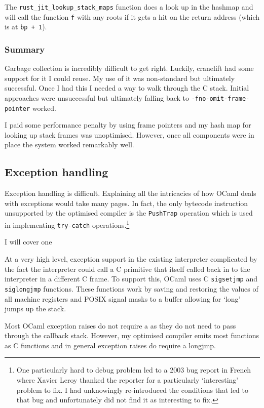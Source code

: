 The \texttt{rust\_jit\_lookup\_stack\_maps} function does a look up in the hashmap and will call
the function \texttt{f} with any roots if it gets a hit on the return address (which is at
\texttt{bp + 1}).

\subsubsection{Summary}

Garbage collection is incredibly difficult to get right. Luckily, cranelift had some support for it
I could reuse. My use of it was non-standard but ultimately successful. Once I had this I needed a
way to walk through the C stack. Initial approaches were unsuccessful but ultimately falling back
to
\texttt{-fno-omit-frame-pointer} worked.

I paid some performance penalty by using frame pointers and my hash map for looking up stack frames
was unoptimised. However, once all components were in place the system worked remarkably well.

\subsection{Exception handling}

Exception handling is difficult. Explaining all the intricacies of how OCaml deals with
exceptions would take many pages. In fact, the only bytecode instruction unsupported by the
optimised compiler is the \texttt{PushTrap} operation which is used in implementing
\texttt{try-catch} operations.\footnote{One particularly hard to debug problem led to a 2003 bug
      report in French where Xavier Leroy thanked the reporter for a particularly `interesting'
      problem
      to fix. I had unknowingly re-introduced the conditions that led to that bug and unfortunately
      did not find it as interesting to fix.}

I will cover one

At a very high level, exception support in the existing interpreter complicated by the fact the
interpreter could call a C primitive that itself called back in to the interpreter in a different C
frame. To support this, OCaml uses C \texttt{sigsetjmp} and \texttt{siglongjmp} functions. These
functions work by saving and restoring the values of all machine registers and POSIX signal masks
to a buffer allowing for `long' jumps up the stack.

Most OCaml exception raises do not require a  as they do not need to pass through
the callback stack. However, my optimised compiler emits most functions as C functions and in
general exception raises do require a longjmp.

